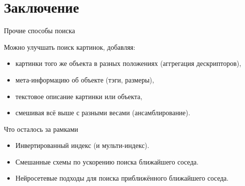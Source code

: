 \section{Заключение}

\begin{frame}{Прочие способы поиска}

Можно улучшать поиск картинок, добавляя:
\begin{itemize}
    \item картинки того же объекта в разных положениях (аггрегация дескрипторов),
    \item мета-информацию об объекте (тэги, размеры),
    \item текстовое описание картинки или объекта,
    \item смешивая всё выше с разными весами (ансамблирование).
\end{itemize}
    
\end{frame}

\begin{frame}{Что осталось за рамками}

\begin{itemize}
    \item Инвертированный индекс (и мульти-индекс).
    \item Смешанные схемы по ускорению поиска ближайшего соседа.
    \item Нейросетевые подходы для поиска приближённого ближайшего соседа.
\end{itemize}
    
\end{frame}
